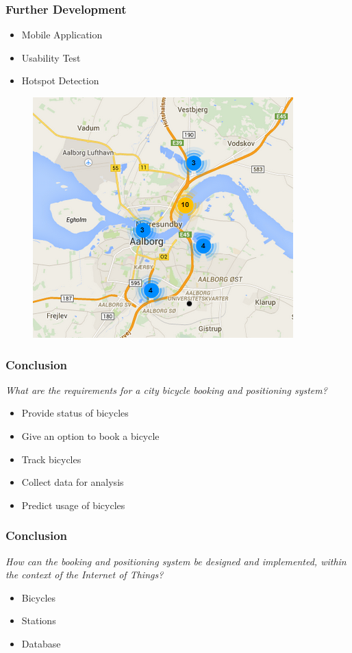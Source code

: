 \begin{frame}
\frametitle{Further Development}
\begin{itemize}
	\item Mobile Application
	\item Usability Test
	\item Hotspot Detection
\end{itemize}
\begin{figure}
\centering
\includegraphics[scale=0.5]{MarkerClusterer}
\end{figure}
\end{frame}

\begin{frame}
\frametitle{Conclusion}
\begin{center}
	\textit{What are the requirements for a city bicycle booking and positioning system?}
\end{center}
\begin{itemize}
	\item[\color{green}\checkmark] Provide status of bicycles
	\item[\color{green}\checkmark] Give an option to book a bicycle
	\item[\color{green}\checkmark] Track bicycles
	\item[\color{green}\checkmark] Collect data for analysis
	\item[\color{red}\div] Predict usage of bicycles
\end{itemize}
\end{frame}

\begin{frame}
	\frametitle{Conclusion}
	\begin{center}
		\textit{How can the booking and positioning system be designed and implemented, within the context of the Internet of Things?}
	\end{center}

\begin{itemize}
	\item[\color{green}\checkmark] Bicycles
	\item[\color{green}\checkmark] Stations
	\item[\color{green}\checkmark] Database
\end{itemize}
\end{frame}

